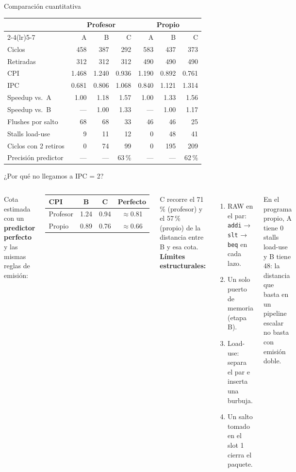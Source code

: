 \documentclass[aspectratio=169,10pt]{beamer}
\newcommand{\sig}[1]{\texttt{#1}}
\begin{document}
\begin{frame}{Comparación cuantitativa}
\centering
\small
\begin{tabular}{lrrr@{\hspace{16pt}}rrr}
\toprule
 & \multicolumn{3}{c}{Profesor} & \multicolumn{3}{c}{Propio} \\
\cmidrule(lr){2-4}\cmidrule(lr){5-7}
 & A & B & C & A & B & C \\
\midrule
Ciclos & 458 & 387 & \alert{292} & 583 & 437 & \alert{373} \\
Retiradas & 312 & 312 & 312 & 490 & 490 & 490 \\
CPI & 1.468 & 1.240 & \alert{0.936} & 1.190 & 0.892 & \alert{0.761} \\
IPC & 0.681 & 0.806 & \alert{1.068} & 0.840 & 1.121 & \alert{1.314} \\
Speedup vs.\ A & 1.00 & 1.18 & \alert{1.57} & 1.00 & 1.33 & \alert{1.56} \\
Speedup vs.\ B & — & 1.00 & \alert{1.33} & — & 1.00 & \alert{1.17} \\
\midrule
Flushes por salto & 68 & 68 & 33 & 46 & 46 & 25 \\
Stalls load-use & 9 & 11 & 12 & 0 & 48 & 41 \\
Ciclos con 2 retiros & 0 & 74 & 99 & 0 & 195 & 209 \\
Precisión predictor & — & — & 63\,\% & — & — & 62\,\% \\
\bottomrule
\end{tabular}
\end{frame}

\begin{frame}{¿Por qué no llegamos a IPC = 2?}
\begin{columns}[T]
Cota estimada con un \textbf{predictor perfecto} y las mismas reglas de emisión:
\begin{center}
\small
\begin{tabular}{lccc}
\toprule
CPI & B & C & Perfecto \\
\midrule
Profesor & 1.24 & 0.94 & $\approx$0.81 \\
Propio & 0.89 & 0.76 & $\approx$0.66 \\
\bottomrule
\end{tabular}
\end{center}
C recorre el \alert{71\,\%} (profesor) y el \alert{57\,\%} (propio) de la distancia entre B y esa cota.
\textbf{Límites estructurales:}
\begin{enumerate}
  \item RAW en el par: \sig{addi} → \sig{slt} → \sig{beq} en cada lazo.
  \item Un solo puerto de memoria (etapa B).
  \item Load-use: separa el par e inserta una burbuja.
  \item Un salto tomado en el slot 1 cierra el paquete.
\end{enumerate}
\footnotesize En el programa propio, A tiene 0 stalls load-use y B tiene 48: la distancia que basta en un pipeline escalar no basta con emisión doble.
\end{columns}
\end{frame}
\end{document}
